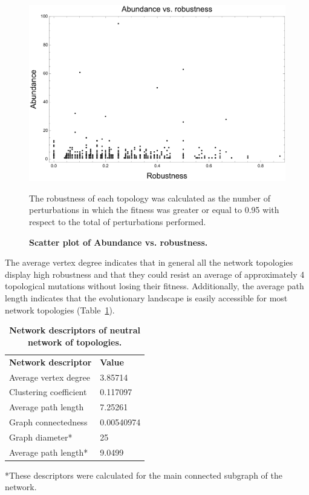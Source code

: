 \documentclass[10pt,letterpaper]{article}
\newlength\savedwidth
\newcommand\thickhline{\noalign{\global\savedwidth\arrayrulewidth\global\arrayrulewidth 2pt}%
\hline
\noalign{\global\arrayrulewidth\savedwidth}}
\begin{document}
\begin{figure}[!h]
 \includegraphics[width=\textwidth]{figures/results/abundance-vs-robustness}
 \caption{\bf Scatter plot of Abundance vs. robustness.}
 The robustness of each topology was calculated as the number of perturbations
 in which the fitness was greater or equal to 0.95 with respect to the total of
 perturbations performed.
 \label{fig:ab-rob}
\end{figure}

The average vertex degree indicates that in general all the network topologies
display high robustness and that they could resist an average of approximately 4
topological mutations without losing their fitness. Additionally, the average
path length indicates that the evolutionary landscape is easily accessible for
most network topologies (Table~\ref{table1}).

\begin{table}[!ht]
 \centering
 \caption{{\bf Network descriptors of neutral network of topologies.}}
 \begin{tabular}{|l|l|}
 \hline
 {\bf Network descriptor} & {\bf Value}\\ \thickhline
 Average vertex degree  & 3.85714 \\ \hline
 Clustering coefficient \cite{Watts1998} & 0.117097 \\ \hline
 Average path length    & 7.25261       \\ \hline
 Graph connectedness    & 0.00540974    \\ \hline
 Graph diameter*        & 25            \\ \hline
 Average path length*   & 9.0499        \\ \hline
 \end{tabular}
 \begin{flushleft} *These descriptors were calculated for the main connected
 subgraph of the network.
 \end{flushleft}
 \label{table1}
 \end{table}
\end{document}
